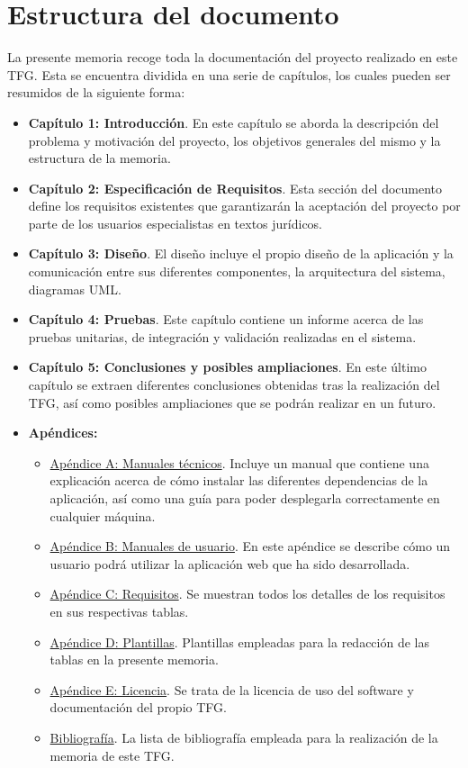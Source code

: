 \section{Estructura del documento}
La presente memoria recoge toda la documentación del proyecto realizado en este TFG. Esta se encuentra dividida en una serie de capítulos, los cuales pueden ser resumidos de la siguiente forma:
\begin{itemize}
\item {\bf Capítulo 1: Introducción}. En este capítulo se aborda la descripción del problema y motivación del proyecto, los objetivos generales del mismo y la estructura de la memoria.
\item {\bf Capítulo 2: Especificación de Requisitos}. Esta sección del documento define los requisitos existentes que garantizarán la aceptación del proyecto por parte de los usuarios especialistas en textos jurídicos.
\item {\bf Capítulo 3: Diseño}. El diseño incluye el propio diseño de la aplicación y la comunicación entre sus diferentes componentes, la arquitectura del sistema, diagramas UML.
\item {\bf Capítulo 4: Pruebas}. Este capítulo contiene un informe acerca de las pruebas unitarias, de integración y validación realizadas en el sistema.
\item {\bf Capítulo 5: Conclusiones y posibles ampliaciones}. En este último capítulo se extraen diferentes conclusiones obtenidas tras la realización del TFG, así como posibles ampliaciones que se podrán realizar en un futuro.
\item {\bf Apéndices:}
\begin{itemize}
\item \underline{Apéndice A: Manuales técnicos}. Incluye un manual que contiene una explicación acerca de cómo instalar las diferentes dependencias de la aplicación, así como una guía para poder desplegarla correctamente en cualquier máquina.
\item \underline{Apéndice B: Manuales de usuario}. En este apéndice se describe cómo un usuario podrá utilizar la aplicación web que ha sido desarrollada.
\item \underline{Apéndice C: Requisitos}. Se muestran todos los detalles de los requisitos en sus respectivas tablas.
\item \underline{Apéndice D: Plantillas}. Plantillas empleadas para la redacción de las tablas en la presente memoria.
\item \underline{Apéndice E: Licencia}. Se trata de la licencia de uso del software y documentación del propio TFG.
\item \underline{Bibliografía}. La lista de bibliografía empleada para la realización de la memoria de este TFG.
\end{itemize}
\end{itemize}